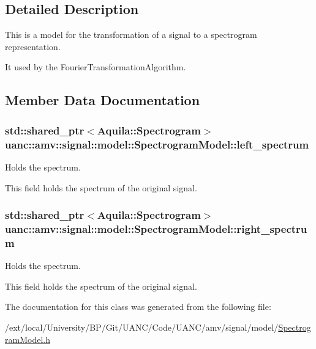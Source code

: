 \subsection{Detailed Description}
This is a model for the transformation of a signal to a spectrogram representation. 

It used by the Fourier\+Transformation\+Algorithm. 

\subsection{Member Data Documentation}
\subsubsection[{\texorpdfstring{left\+\_\+spectrum}{left_spectrum}}]{\setlength{\rightskip}{0pt plus 5cm}std\+::shared\+\_\+ptr$<$Aquila\+::\+Spectrogram$>$ uanc\+::amv\+::signal\+::model\+::\+Spectrogram\+Model\+::left\+\_\+spectrum}\hypertarget{classuanc_1_1amv_1_1signal_1_1model_1_1_spectrogram_model_accb3ed97c155fdec9022bb2d5b106015}{}\label{classuanc_1_1amv_1_1signal_1_1model_1_1_spectrogram_model_accb3ed97c155fdec9022bb2d5b106015}


Holds the spectrum. 

This field holds the spectrum of the original signal. 
\subsubsection[{\texorpdfstring{right\+\_\+spectrum}{right_spectrum}}]{\setlength{\rightskip}{0pt plus 5cm}std\+::shared\+\_\+ptr$<$Aquila\+::\+Spectrogram$>$ uanc\+::amv\+::signal\+::model\+::\+Spectrogram\+Model\+::right\+\_\+spectrum}\hypertarget{classuanc_1_1amv_1_1signal_1_1model_1_1_spectrogram_model_a3a3559cdc08ae00f3617de962e606c4a}{}\label{classuanc_1_1amv_1_1signal_1_1model_1_1_spectrogram_model_a3a3559cdc08ae00f3617de962e606c4a}


Holds the spectrum. 

This field holds the spectrum of the original signal. 

The documentation for this class was generated from the following file\+:\begin{DoxyCompactItemize}
\item 
/ext/local/\+University/\+B\+P/\+Git/\+U\+A\+N\+C/\+Code/\+U\+A\+N\+C/amv/signal/model/\hyperlink{_spectrogram_model_8h}{Spectrogram\+Model.\+h}\end{DoxyCompactItemize}
